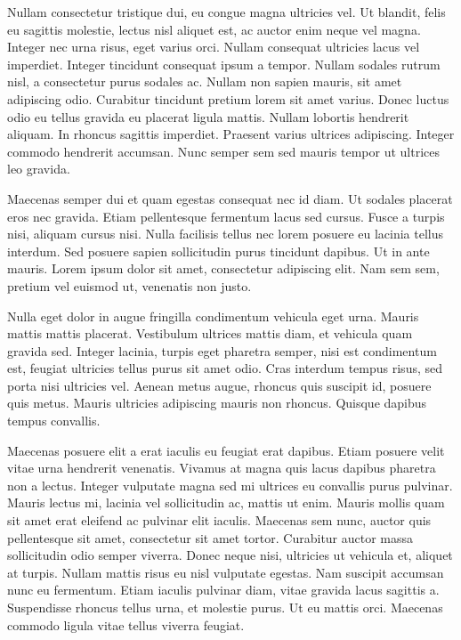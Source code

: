 \documentclass[a4paper]{article}
\begin{document}
Nullam consectetur tristique dui, eu congue magna ultricies vel. Ut blandit, felis eu sagittis molestie, lectus nisl aliquet est, ac auctor enim neque vel magna. Integer nec urna risus, eget varius orci. Nullam consequat ultricies lacus vel imperdiet. Integer tincidunt consequat ipsum a tempor. Nullam sodales rutrum nisl, a consectetur purus sodales ac. Nullam non sapien mauris, sit amet adipiscing odio. Curabitur tincidunt pretium lorem sit amet varius. Donec luctus odio eu tellus gravida eu placerat ligula mattis. Nullam lobortis hendrerit aliquam. In rhoncus sagittis imperdiet. Praesent varius ultrices adipiscing. Integer commodo hendrerit accumsan. Nunc semper sem sed mauris tempor ut ultrices leo gravida.

Maecenas semper dui et quam egestas consequat nec id diam. Ut sodales placerat eros nec gravida. Etiam pellentesque fermentum lacus sed cursus. Fusce a turpis nisi, aliquam cursus nisi. Nulla facilisis tellus nec lorem posuere eu lacinia tellus interdum. Sed posuere sapien sollicitudin purus tincidunt dapibus. Ut in ante mauris. Lorem ipsum dolor sit amet, consectetur adipiscing elit. Nam sem sem, pretium vel euismod ut, venenatis non justo.

Nulla eget dolor in augue fringilla condimentum vehicula eget urna. Mauris mattis mattis placerat. Vestibulum ultrices mattis diam, et vehicula quam gravida sed. Integer lacinia, turpis eget pharetra semper, nisi est condimentum est, feugiat ultricies tellus purus sit amet odio. Cras interdum tempus risus, sed porta nisi ultricies vel. Aenean metus augue, rhoncus quis suscipit id, posuere quis metus. Mauris ultricies adipiscing mauris non rhoncus. Quisque dapibus tempus convallis.

Maecenas posuere elit a erat iaculis eu feugiat erat dapibus. Etiam posuere velit vitae urna hendrerit venenatis. Vivamus at magna quis lacus dapibus pharetra non a lectus. Integer vulputate magna sed mi ultrices eu convallis purus pulvinar. Mauris lectus mi, lacinia vel sollicitudin ac, mattis ut enim. Mauris mollis quam sit amet erat eleifend ac pulvinar elit iaculis. Maecenas sem nunc, auctor quis pellentesque sit amet, consectetur sit amet tortor. Curabitur auctor massa sollicitudin odio semper viverra. Donec neque nisi, ultricies ut vehicula et, aliquet at turpis. Nullam mattis risus eu nisl vulputate egestas. Nam suscipit accumsan nunc eu fermentum. Etiam iaculis pulvinar diam, vitae gravida lacus sagittis a. Suspendisse rhoncus tellus urna, et molestie purus. Ut eu mattis orci. Maecenas commodo ligula vitae tellus viverra feugiat.
\end{document}
